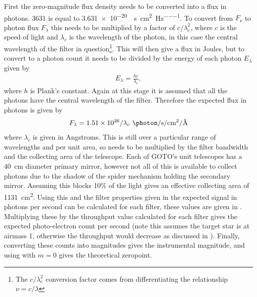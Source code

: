 \begin{colsection}
\begin{colsection}
First the zero-magnitude flux density needs to be converted into a flux in photons. \SI{3631}{\jansky} is equal to \SI{3.631e-20}{\erg\per\second\per\centi\metre\squared\per\hertz}. To convert from $F_\nu$ to photon flux $F_\lambda$ this needs to be multiplied by a factor of $c/\lambda_c^2$, where $c$ is the speed of light and $\lambda_c$ is the wavelength of the photon, in this case the central wavelength of the filter in question\footnote{The $c/\lambda_c^2$ conversion factor comes from differentiating the relationship $\nu = c/\lambda$}. This will then give a flux in Joules, but to convert to a photon count it needs to be divided by the energy of each photon $E_\lambda$ given by
%
\begin{equation}
    \begin{split}
        E_\lambda = \frac{hc}{\lambda_c},
    \end{split}
    \label{eq:photon_energy}
\end{equation}
%
where $h$ is Plank's constant. Again at this stage it is assumed that all the photons have the central wavelength of the filter. Therefore the expected flux in photons is given by
%
\begin{equation}
    \begin{split}
        F_\lambda = 1.51 \times 10^{26}/\lambda_c~\si{\photon\per\second\per\centi\metre\squared\per\angstrom}
    \end{split}
    \label{eq:zero-mag_photons}
\end{equation}
%
where $\lambda_c$ is given in Angstroms. This is still over a particular range of wavelengths and per unit area, so needs to be multiplied by the filter bandwidth and the collecting area of the telescope. Each of GOTO's unit telescopes has a \SI{40}{\centi\metre} diameter primary mirror, however not all of this is available to collect photons due to the shadow of the spider mechanism holding the secondary mirror. Assuming this blocks 10\% of the light gives an effective collecting area of \SI{1131}{\centi\metre\squared}. Using this and the filter properties given in  the expected signal in photons per second can be calculated for each filter, these values are given in . Multiplying these by the throughput value calculated for each filter gives the expected photo-electron count per second (note this assumes the target star is at airmass 1, otherwise the throughput would decrease as discussed in ). Finally, converting these counts into magnitudes gives the instrumental magnitude, and using  with $m=0$ gives the theoretical zeropoint.


\end{colsection}
\end{colsection}
